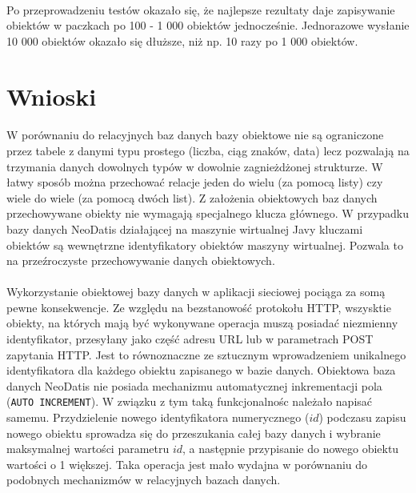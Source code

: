 \documentclass[wide,a4paper,titlepage,12pt] {article}
\begin{document}
  \paragraph{}
  Po przeprowadzeniu testów okazało się, że najlepsze rezultaty daje zapisywanie obiektów w paczkach po 100 - 1 000 obiektów jednocześnie. Jednorazowe wysłanie 10 000 obiektów okazało się dłuższe, niż np. 10 razy po 1 000 obiektów.

  \newpage
  \section{Wnioski}
  \paragraph{}
  W porównaniu do relacyjnych baz danych bazy obiektowe nie są ograniczone przez tabele z danymi typu prostego (liczba, ciąg znaków, data) lecz pozwalają na trzymania danych dowolnych typów w dowolnie zagnieżdżonej strukturze. W łatwy sposób można przechować relacje jeden do wielu (za pomocą listy) czy wiele do wiele (za pomocą dwóch list). Z założenia obiektowych baz danych przechowywane obiekty nie wymagają specjalnego klucza głównego. W przypadku bazy danych NeoDatis działającej na maszynie wirtualnej Javy kluczami obiektów są wewnętrzne identyfikatory obiektów maszyny wirtualnej. Pozwala to na przeźroczyste przechowywanie danych obiektowych.

  \paragraph{}
  Wykorzystanie obiektowej bazy danych w aplikacji sieciowej pociąga za somą pewne konsekwencje. Ze względu na bezstanowość protokołu HTTP, wszysktie obiekty, na których mają być wykonywane operacja muszą posiadać niezmienny identyfikator, przesyłany jako część adresu URL lub w parametrach POST zapytania HTTP. Jest to równoznaczne ze sztucznym wprowadzeniem unikalnego identyfikatora dla każdego obiektu zapisanego w bazie danych. Obiektowa baza danych NeoDatis nie posiada mechanizmu automatycznej inkrementacji pola (\texttt{AUTO INCREMENT}). W związku z tym taką funkcjonalnośc należało napisać samemu. Przydzielenie nowego identyfikatora numerycznego ($id$) podczasu zapisu nowego obiektu sprowadza się do przeszukania całej bazy danych i wybranie maksymalnej wartości parametru $id$, a następnie przypisanie do nowego obiektu wartości o 1 większej. Taka operacja jest mało wydajna w porównaniu do podobnych mechanizmów w relacyjnych bazach danych.
\end{document}
